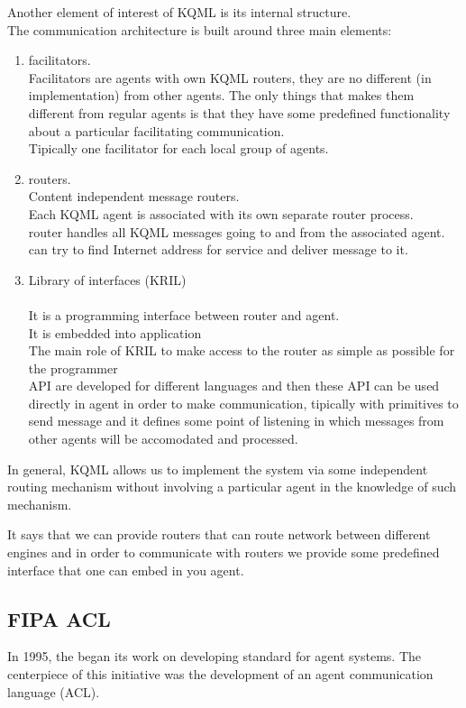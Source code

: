 Another element of interest of KQML is its internal structure.\\
The communication architecture is built around three main elements:
\begin{enumerate}
\item facilitators.\\
Facilitators are agents with own KQML routers, they are no different (in implementation) from other agents.
The only things that makes them different from regular agents is that they have some predefined functionality about a particular facilitating communication.\\
Tipically one facilitator for each local group of agents.
\item routers.\\
Content independent message routers.\\
Each KQML agent is associated with its own separate router process.\\
router handles all KQML messages going to and from the associated agent.\\
can try to find Internet address for service and deliver message to it.
\item Library of interfaces (KRIL)\\
\\
It is a programming interface between router and agent.\\
It is embedded into application\\
The main role of KRIL to make access to the router as simple as possible for the programmer\\
API are developed for different languages and then these API can be used directly in agent in order to make communication, tipically with primitives to send message and it defines some point of  listening in which messages from other agents will be accomodated and processed.
\end{enumerate}
In general, KQML allows us to implement the system via some independent routing mechanism without involving a particular agent in the knowledge of such mechanism.

It says that we can provide routers that can route network between different engines  and in order to communicate with routers we provide some predefined interface that one can embed in you agent.
\subsection{FIPA ACL}
In 1995, the  began its work on developing standard for agent systems. The centerpiece of this initiative was the development of an agent communication language (ACL).

